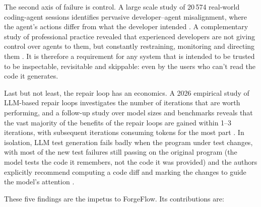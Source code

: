 \documentclass[pdflatex,sn-mathphys-num]{sn-jnl}%
\theoremstyle{thmstyleone}%
\theoremstyle{thmstyletwo}%
\theoremstyle{thmstylethree}%
\begin{document}
The second axis of failure is control. A large scale study of 20\,574 real-world coding-agent sessions identifies pervasive developer--agent misalignment, where the agent's actions differ from what the developer intended \cite{r07tang}. A complementary study of professional practice revealed that experienced developers are not giving control over agents to them, but constantly restraining, monitoring and directing them \cite{r08huang}. It is therefore a requirement for any system that is intended to be trusted to be inspectable, revisitable and skippable: even by the users who can't read the code it generates.

Last but not least, the repair loop has an economics. A 2026 empirical study of LLM-based repair loops investigates the number of iterations that are worth performing, and a follow-up study over model sizes and benchmarks reveals that the vast majority of the benefits of the repair loops are gained within 1--3 iterations, with subsequent iterations consuming tokens for the most part \cite{r09kiecker,r10arimbur}. In isolation, LLM test generation fails badly when the program under test changes, with most of the new test failures still passing on the original program (the model tests the code it remembers, not the code it was provided) and the authors explicitly recommend computing a code diff and marking the changes to guide the model's attention \cite{r11haroon}.

These five findings are the impetus to ForgeFlow. Its contributions are:
\end{document}
